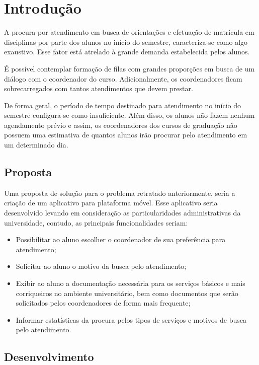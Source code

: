\chapter[Introdução]{Introdução}
\label{chap:introducao}
	
	A procura por atendimento em busca de orientações e efetuação de matrícula em disciplinas por parte dos alunos no início do semestre, caracteriza-se como algo exaustivo. Esse fator está atrelado à grande demanda estabelecida pelos alunos.

	É possível contemplar formação de filas com grandes proporções em busca de um diálogo com o coordenador do curso. Adicionalmente, os coordenadores ficam sobrecarregados com tantos atendimentos que devem prestar. 
	
	De forma geral, o período de tempo destinado para atendimento no início do semestre configura-se como insuficiente. Além disso, os alunos não fazem nenhum agendamento prévio e assim, os coordenadores dos cursos de graduação não possuem uma estimativa de quantos alunos irão procurar pelo atendimento em um determinado dia.

	\section[Proposta]{Proposta}
	\label{sec:introducao_proposta}

		Uma proposta de solução para o problema retratado anteriormente, seria a criação de um aplicativo para plataforma móvel. Esse aplicativo seria desenvolvido levando em consideração as particularidades administrativas da universidade, contudo, as principais funcionalidades seriam:

		\begin{itemize}
			\item{Possibilitar ao aluno escolher o coordenador de sua preferência para atendimento;}
			\item{Solicitar ao aluno o motivo da busca pelo atendimento;}
			\item{Exibir ao aluno a documentação necessária para os serviços básicos e mais corriqueiros no ambiente universitário, bem como documentos que serão solicitados pelos coordenadores de forma mais frequente;}
			\item{Informar estatísticas da procura pelos tipos de serviços e motivos de busca pelo atendimento.}
		\end{itemize}

	\section[Desenvolvimento]{Desenvolvimento}
	\label{sec:introducao_desenvolvimento}

